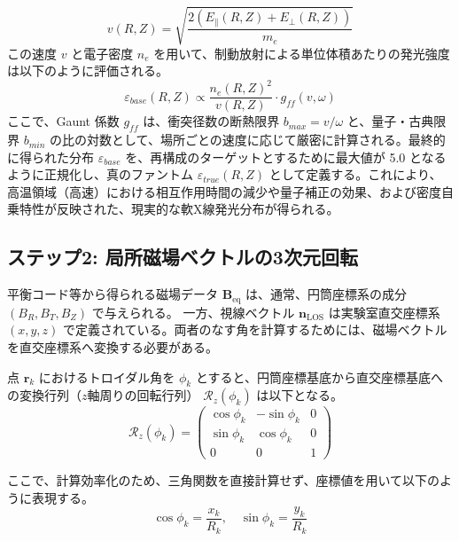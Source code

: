 \documentclass[a4paper,11pt]{bxjsarticle} %
\begin{document}
\begin{equation}
    v(R, Z) = \sqrt{\frac{2(E_{\parallel}(R, Z) + E_{\perp}(R, Z))}{m_e}}
\end{equation}
この速度 $v$ と電子密度 $n_e$ を用いて、制動放射による単位体積あたりの発光強度は以下のように評価される。
\begin{equation}
    \varepsilon_{base}(R, Z) \propto \frac{n_e(R, Z)^2}{v(R, Z)} \cdot g_{ff}(v, \omega)
\end{equation}
ここで、Gaunt 係数 $g_{ff}$ は、衝突径数の断熱限界 $b_{max} = v/\omega$ と、量子・古典限界 $b_{min}$ の比の対数として、場所ごとの速度に応じて厳密に計算される。最終的に得られた分布 $\varepsilon_{base}$ を、再構成のターゲットとするために最大値が 5.0 となるように正規化し、真のファントム $\varepsilon_{true}(R, Z)$ として定義する。これにより、高温領域（高速）における相互作用時間の減少や量子補正の効果、および密度自乗特性が反映された、現実的な軟X線発光分布が得られる。


\subsection{ステップ2: 局所磁場ベクトルの3次元回転}
平衡コード等から得られる磁場データ $\bm{B}_{\mathrm{eq}}$ は、通常、円筒座標系の成分 $(B_R, B_T, B_Z)$ で与えられる。
一方、視線ベクトル $\bm{n}_{\mathrm{LOS}}$ は実験室直交座標系 $(x, y, z)$ で定義されている。両者のなす角を計算するためには、磁場ベクトルを直交座標系へ変換する必要がある。

点 $\bm{r}_k$ におけるトロイダル角を $\phi_k$ とすると、円筒座標基底から直交座標基底への変換行列（$z$軸周りの回転行列） $\mathcal{R}_z(\phi_k)$ は以下となる。
\begin{equation}
    \mathcal{R}_z(\phi_k) = 
    \begin{pmatrix}
        \cos\phi_k & -\sin\phi_k & 0 \\
        \sin\phi_k & \cos\phi_k & 0 \\
        0 & 0 & 1
    \end{pmatrix}
\end{equation}

ここで、計算効率化のため、三角関数を直接計算せず、座標値を用いて以下のように表現する。
\begin{equation}
    \cos\phi_k = \frac{x_k}{R_k}, \quad \sin\phi_k = \frac{y_k}{R_k}
\end{equation}
\end{document}

